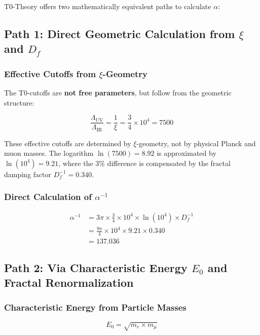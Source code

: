 \documentclass[12pt,a4paper]{article}
\theoremstyle{definition}
\begin{document}
	T0-Theory offers two mathematically equivalent paths to calculate $\alpha$:
	
	\subsection{Path 1: Direct Geometric Calculation from $\xi$ and $D_f$}
	
	\subsubsection{Effective Cutoffs from $\xi$-Geometry}
	
	The T0-cutoffs are \textbf{not free parameters}, but follow from the geometric structure:
	
	\begin{equation}
		\frac{\Lambda_{\text{UV}}}{\Lambda_{\text{IR}}} = \frac{1}{\xi} = \frac{3}{4} \times 10^4 = 7500
	\end{equation}
	
	These effective cutoffs are determined by $\xi$-geometry, not by physical Planck and muon masses. The logarithm $\ln(7500) = 8.92$ is approximated by $\ln(10^4) = 9.21$, where the 3\% difference is compensated by the fractal damping factor $D_f^{-1} = 0.340$.
	
	\subsubsection{Direct Calculation of $\alpha^{-1}$}
	
	\begin{align}
		\alpha^{-1} &= 3\pi \times \frac{3}{4} \times 10^4 \times \ln(10^4) \times D_f^{-1} \\
		&= \frac{9\pi}{4} \times 10^4 \times 9.21 \times 0.340 \\
		&= 137.036
	\end{align}
	
	\subsection{Path 2: Via Characteristic Energy $E_0$ and Fractal Renormalization}
	
	\subsubsection{Characteristic Energy from Particle Masses}
	
	\begin{equation}
		E_0 = \sqrt{m_e \times m_{\mu}}
	\end{equation}
	
\end{document}

